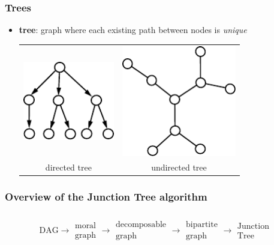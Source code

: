 \begin{frame} \frametitle{Trees}
	\begin{itemize}
	\item\textbf{tree}: graph where each existing path 
			between nodes is \emph{unique}
	
	\vspace{2mm}
	\begin{center}
	\begin{tabular}{cc}
		\includegraphics[width=4cm]{img/tree_directed}
		&
		\hspace{-5mm}
		\includegraphics[width=5cm]{img/tree_undirected} \\
		directed tree & \hspace{-5mm} undirected tree 
	\end{tabular}
	\end{center}
	\end{itemize}
\end{frame}

\subsubsection{Overview of the Junction Tree algorithm}

\begin{frame}\frametitle{\subsubsecname}

\begin{align*}
\text{DAG}
\longrightarrow \substack{\text{moral}\\\text{graph}}
\longrightarrow \substack{\text{decomposable}\\\text{graph}}
\longrightarrow \substack{\text{bipartite}\\\text{graph}}
\longrightarrow \substack{\text{Junction}\\\text{Tree}}
\end{align*}

\end{frame}

